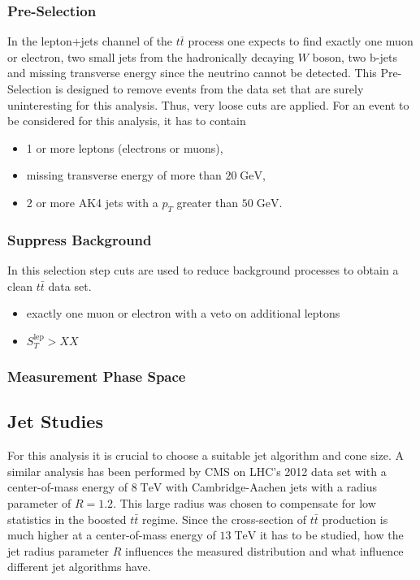 \subsubsection{Pre-Selection}
\label{sssec:PreSel}
	In the lepton+jets channel of the $t\bar{t}$ process one expects to find exactly one muon or electron, two small jets from the hadronically decaying $W$ boson, two b-jets and missing transverse energy since the neutrino cannot be detected. This Pre-Selection is designed to remove events from the data set that are surely uninteresting for this analysis. Thus, very loose cuts are applied. For an event to be considered for this analysis, it has to contain
	\begin{itemize}
	\item 1 or more leptons (electrons or muons),
	\item missing transverse energy of more than $20\;\text{GeV}$,
	\item 2 or more AK4 jets with a $p_T$ greater than $50\;\text{GeV}$.
	\end{itemize}
	
\subsubsection{Suppress Background}
\label{sssec:BackSel}
	In this selection step cuts are used to reduce background processes to obtain a clean $t\bar{t}$ data set. 
	\begin{itemize}
	\item exactly one muon or electron with a veto on additional leptons
	\item $S_T^\text{lep} > XX$
	\end{itemize}
\subsubsection{Measurement Phase Space}
\label{sssec:FinalSel}

	
	
\subsection{Jet Studies}
	For this analysis it is crucial to choose a suitable jet algorithm and cone size. A similar analysis has been performed by CMS on LHC's 2012 data set with a center-of-mass energy of $8\;\text{TeV}$ with Cambridge-Aachen jets with a radius parameter of $R=1.2$. This large radius was chosen to compensate for low statistics in the boosted $t\bar{t}$ regime. Since the cross-section of $t\bar{t}$ production is much higher at a center-of-mass energy of $13\;\text{TeV}$ it has to be studied, how the jet radius parameter $R$ influences the measured distribution and what influence different jet algorithms have.
